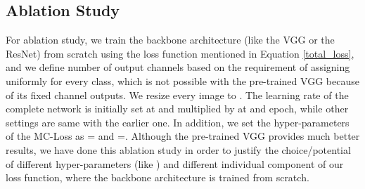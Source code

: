 \documentclass[journal]{IEEEtran}
\begin{document}
\subsection{Ablation Study}\label{Ablation}

For ablation study, we train the backbone architecture (like the VGG or the ResNet) from scratch using the loss function mentioned in Equation \ref{total_loss}, and we define number of output channels based on the requirement of assigning  uniformly for every class, which is not possible with the pre-trained VGG because of its fixed channel outputs. We resize every image to . The learning rate of the complete network is initially set at  and multiplied by  at  and  epoch, while other settings are same with the earlier one. In addition, we set the hyper-parameters of the MC-Loss as  = and =. Although the  pre-trained VGG provides much better results, we have done this ablation study in order to justify the choice/potential of different hyper-parameters (like ) and different individual component of our loss function, where the backbone architecture is trained from scratch. 

 
\end{document}
